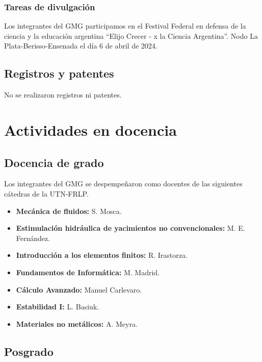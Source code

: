 \documentclass[a4paper,11pt,twoside,final,titlepage,onecolumn,openright]{report}
\begin{document}
\subsection{Tareas de divulgación}

Los integrantes del GMG participamos en el Festival Federal en defensa de la ciencia y la educación argentina  “Elijo Crecer - x la Ciencia Argentina”. Nodo La Plata-Berisso-Ensenada el día 6 de abril de 2024.


\section{Registros y patentes}

No se realizaron registros ni patentes.


\chapter{Actividades en docencia}

\section{Docencia de grado}

Los integrantes del GMG se despempeñaron como docentes de las siguientes cátedras de la UTN-FRLP.

\begin{itemize}
 \item {\bf Mecánica de fluidos:} S. Mosca.
 \item {\bf Estimulación hidráulica de yacimientos no convencionales:} M. E. Fernández.
 \item {\bf Introducción a los elementos finitos:} R. Irastorza.
 \item {\bf Fundamentos de Informática:} M. Madrid.
 \item {\bf Cálculo Avanzado:} Manuel Carlevaro.
 \item \textbf{Estabilidad I:} L. Basiuk.
 \item \textbf{Materiales no metálicos:} A. Meyra.
\end{itemize}




\section{Posgrado}
\end{document}
